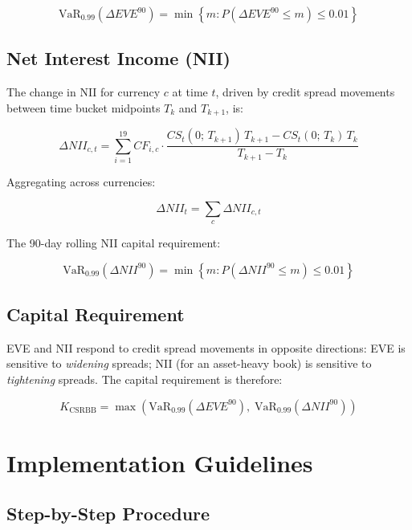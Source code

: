 \documentclass[11pt, a4paper]{article}
\begin{document}
\[
    \mathrm{VaR}_{0.99}\!\left(\Delta EVE^{90}\right)
    = \min\left\{m : P\!\left(\Delta EVE^{90} \leq m\right) \leq 0.01\right\}
\]

\subsection{Net Interest Income (NII)}

The change in NII for currency $c$ at time $t$, driven by credit spread movements between time bucket midpoints $T_k$ and $T_{k+1}$, is:

\[
    \Delta NII_{c,t} = \sum_{i=1}^{19} CF_{i,c} \cdot
    \frac{CS_t(0;\, T_{k+1})\,T_{k+1} - CS_t(0;\, T_k)\,T_k}{T_{k+1} - T_k}
\]

Aggregating across currencies:

\[
    \Delta NII_t = \sum_{c} \Delta NII_{c,t}
\]

The 90-day rolling NII capital requirement:

\[
    \mathrm{VaR}_{0.99}\!\left(\Delta NII^{90}\right)
    = \min\left\{m : P\!\left(\Delta NII^{90} \leq m\right) \leq 0.01\right\}
\]

\subsection{Capital Requirement}

EVE and NII respond to credit spread movements in opposite directions: EVE is sensitive to \textit{widening} spreads; NII (for an asset-heavy book) is sensitive to \textit{tightening} spreads. The capital requirement is therefore:

\[
    K_{\mathrm{CSRBB}} = \max\!\left(\mathrm{VaR}_{0.99}(\Delta EVE^{90}),\;
    \mathrm{VaR}_{0.99}(\Delta NII^{90})\right)
\]

\section{Implementation Guidelines}

\subsection{Step-by-Step Procedure}
\end{document}

